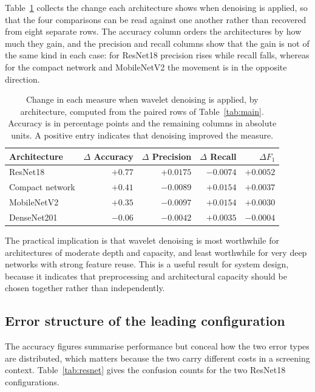 Table~\ref{tab:delta} collects the change each architecture shows when
denoising is applied, so that the four comparisons can be read against one
another rather than recovered from eight separate rows. The accuracy column
orders the architectures by how much they gain, and the precision and recall
columns show that the gain is not of the same kind in each case: for ResNet18
precision rises while recall falls, whereas for the compact network and
MobileNetV2 the movement is in the opposite direction.

\begin{table}[t]
\centering
\footnotesize
\caption{Change in each measure when wavelet denoising is applied, by
architecture, computed from the paired rows of Table~\ref{tab:main}. Accuracy
is in percentage points and the remaining columns in absolute units. A
positive entry indicates that denoising improved the measure.}
\label{tab:delta}
\begin{tabular}{@{}lrrrr@{}}
\toprule
Architecture & $\Delta$ Accuracy & $\Delta$ Precision & $\Delta$ Recall & $\Delta F_1$ \\
\midrule
ResNet18 & $+0.77$ & $+0.0175$ & $-0.0074$ & $+0.0052$ \\
Compact network & $+0.41$ & $-0.0089$ & $+0.0154$ & $+0.0037$ \\
MobileNetV2 & $+0.35$ & $-0.0097$ & $+0.0154$ & $+0.0030$ \\
DenseNet201 & $-0.06$ & $-0.0042$ & $+0.0035$ & $-0.0004$ \\
\bottomrule
\end{tabular}
\end{table}

The practical implication is that wavelet denoising is most worthwhile for
architectures of moderate depth and capacity, and least worthwhile for very
deep networks with strong feature reuse. This is a useful result for system
design, because it indicates that preprocessing and architectural capacity
should be chosen together rather than independently.

\subsection{Error structure of the leading configuration}\label{sec:res-errors}

The accuracy figures summarise performance but conceal how the two error types
are distributed, which matters because the two carry different costs in a
screening context. Table~\ref{tab:resnet} gives the confusion counts for the
two ResNet18 configurations.

